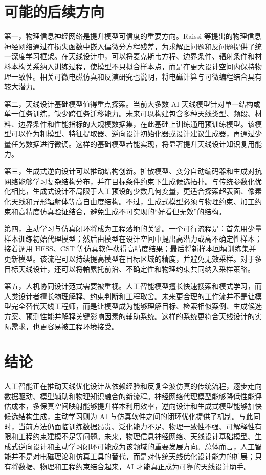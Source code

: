 \documentclass[UTF8,a4paper,12pt]{ctexart}
\begin{document}
\section{可能的后续方向}

第一，物理信息神经网络是提升模型可信度的重要方向。Raissi 等提出的物理信息神经网络通过在损失函数中嵌入偏微分方程残差，为求解正问题和反问题提供了统一深度学习框架\cite{raissi2019pinn}。在天线设计中，可以将麦克斯韦方程、边界条件、辐射条件和材料本构关系纳入训练过程，使模型不只拟合样本点，而是在更大设计空间内保持物理一致性。相关可微电磁仿真和反演研究也说明，将电磁计算与可微编程结合具有较大潜力\cite{hu2022theory}。

第二，天线设计基础模型值得重点探索。当前大多数 AI 天线模型针对单一结构或单一任务训练，缺少跨任务迁移能力。未来可以构建包含多种天线类型、频段、材料、边界条件和性能指标的大规模数据集，在此基础上训练通用预训练模型。该模型可以作为粗模型、特征提取器、逆向设计初始化器或设计建议生成器，再通过少量任务数据进行微调。这样的基础模型若能实现，将显著提升天线设计知识复用能力。

第三，生成式逆向设计可以推动结构创新。扩散模型、变分自动编码器和生成对抗网络能够学习复杂结构分布，并在目标条件约束下生成候选拓扑。与传统参数化优化相比，生成式设计不局限于人工预设的少数几何变量，更适合探索超表面、像素化天线和异形辐射体等高自由度结构。不过，生成式模型必须与物理约束、加工约束和高精度仿真验证结合，避免生成不可实现的“好看但无效”的结构。

第四，主动学习与仿真闭环将成为工程落地的关键。一个可行流程是：首先用少量样本训练初始代理模型；然后由模型在设计空间中提出高潜力或高不确定性样本；接着调用 HFSS、CST 等仿真软件获得高精度结果；最后将新样本回填训练集并更新模型。该流程可以持续提高模型在目标区域的精度，并避免无效采样。对于多目标天线设计，还可以将帕累托前沿、不确定性和物理约束共同纳入采样策略。

第五，人机协同设计范式需要被重视。人工智能模型擅长快速搜索和模式学习，而人类设计者擅长物理解释、约束判断和工程取舍。未来更合理的工作流并不是让模型完全替代天线工程师，而是让模型成为能够理解目标、检索相似案例、生成候选方案、预测性能并解释关键影响因素的辅助系统。这样的系统更符合天线设计的实际需求，也更容易被工程环境接受。

\section{结论}

人工智能正在推动天线优化设计从依赖经验和反复全波仿真的传统流程，逐步走向数据驱动、模型辅助和物理知识融合的新流程。神经网络代理模型能够降低性能评估成本，多保真空间映射能够提升样本利用效率，逆向设计和生成式模型能够加快候选结构生成，主动学习则为 AI 与仿真软件之间的闭环优化提供了机制。与此同时，当前方法仍面临训练数据昂贵、泛化能力不足、物理一致性不强、可解释性有限和工程约束建模不足等问题。未来，物理信息神经网络、天线设计基础模型、生成式逆向设计和主动学习闭环可能成为该领域的重要发展方向。总体而言，人工智能并不是对电磁理论和仿真工具的替代，而是对传统天线优化设计能力的扩展；只有将数据、物理和工程约束结合起来，AI 才能真正成为可靠的天线设计助手。
\end{document}
